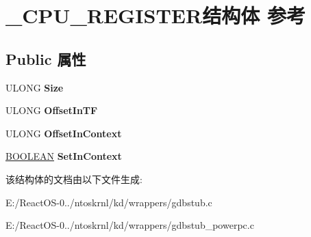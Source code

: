 \hypertarget{struct___c_p_u___r_e_g_i_s_t_e_r}{}\section{\+\_\+\+C\+P\+U\+\_\+\+R\+E\+G\+I\+S\+T\+E\+R结构体 参考}
\label{struct___c_p_u___r_e_g_i_s_t_e_r}
\subsection*{Public 属性}
\begin{DoxyCompactItemize}
\item 
\mbox{\label{struct___c_p_u___r_e_g_i_s_t_e_r_ab4d7901b0fee5ff454c4098f28616eba}} 
U\+L\+O\+NG {\bfseries Size}
\item 
\mbox{\label{struct___c_p_u___r_e_g_i_s_t_e_r_a3c6917c1cac636d685e81fe1e4af07dd}} 
U\+L\+O\+NG {\bfseries Offset\+In\+TF}
\item 
\mbox{\label{struct___c_p_u___r_e_g_i_s_t_e_r_adbb137c6e6fd762b36fa54d6b10f668e}} 
U\+L\+O\+NG {\bfseries Offset\+In\+Context}
\item 
\mbox{\label{struct___c_p_u___r_e_g_i_s_t_e_r_a90cba365aa470d6e101d8cd32b146f46}} 
\hyperlink{_processor_bind_8h_a112e3146cb38b6ee95e64d85842e380a}{B\+O\+O\+L\+E\+AN} {\bfseries Set\+In\+Context}
\end{DoxyCompactItemize}


该结构体的文档由以下文件生成\+:\begin{DoxyCompactItemize}
\item 
E\+:/\+React\+O\+S-\/0../ntoskrnl/kd/wrappers/gdbstub.\+c\item 
E\+:/\+React\+O\+S-\/0../ntoskrnl/kd/wrappers/gdbstub\+\_\+powerpc.\+c\end{DoxyCompactItemize}
